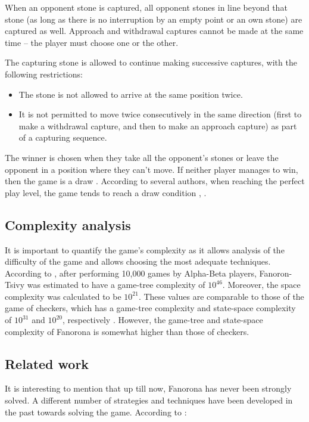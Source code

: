 \documentclass[journal]{IEEEtran}
\begin{document}
When an opponent stone is captured, all opponent stones in line beyond that stone (as long as there is no interruption by an empty point or an own stone) are captured as well. Approach and withdrawal captures cannot be made at the same time – the player must choose one or the other.

The capturing stone is allowed to continue making successive captures, with the following restrictions:
\begin{itemize}
  \item The stone is not allowed to arrive at the same position twice.
  \item It is not permitted to move twice consecutively in the same direction (first to make a withdrawal capture, and then to make an approach capture) as part of a capturing sequence.
\end{itemize}

The winner is chosen when they take all the opponent's stones or leave the opponent in a position where they can't move. If neither player manages to win, then the game is a draw \cite{walker2014book}. According to several authors, when reaching the perfect play level, the game tends to reach a draw condition \cite{Schadd2008}, \cite{draw2015}.


\subsection{Complexity analysis}
It is important to quantify the game's complexity as it allows analysis of the difficulty of the game and allows choosing the most adequate techniques. According to \cite{Schadd2008}, after performing 10,000 games by Alpha-Beta players, Fanoron-Tsivy was estimated to have a game-tree complexity of $10^{46}$. Moreover, the space complexity was calculated to be $10^{21}$. These values are comparable to those of the game of checkers, which has a game-tree complexity and state-space complexity of $10^{31}$ and $10^{20}$, respectively \cite{Schaeffer2007}. However, the game-tree and state-space complexity of Fanorona is somewhat higher than those of checkers.


\subsection{Related work}

It is interesting to mention that up till now, Fanorona has never been strongly solved.
A different number of strategies and techniques have been developed in the past towards solving the game. According to \cite{draw2015}:
\end{document}
